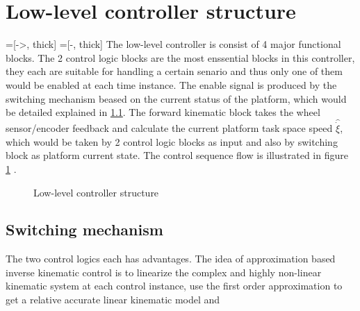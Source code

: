 \section{Low-level controller structure}
\label{sec:structure}
=[->, thick]
=[-, thick]
The low-level controller is consist of 4 major functional blocks. The 2 control logic blocks are the most enssential blocks in this controller, they each are suitable for handling a certain senario and thus only 
one of them would be enabled at each time instance. The enable signal is produced by the switching mechanism beased on the current status of the platform, which would be detailed explained in \cref{subsec:switching}.
The forward kinematic block takes the wheel sensor/encoder feedback and calculate the current platform task space speed $\hat{\dot{\xi}} $, which would be taken by 2 control logic blocks as input and also by 
switching block as platform current state. The control sequence flow is illustrated in figure \cref{fig:controller} .
\begin{figure}[t]\label{fig:controller}
	\begin{center}
	\end{center}
	\caption{Low-level controller structure}
\end{figure}
\subsection{Switching mechanism}
\label{subsec:switching}
The two control logics each has advantages. 
The idea of approximation based inverse kinematic control is to linearize the complex and highly non-linear kinematic system at each control instance, use the first order approximation to get a relative accurate linear
kinematic model and 